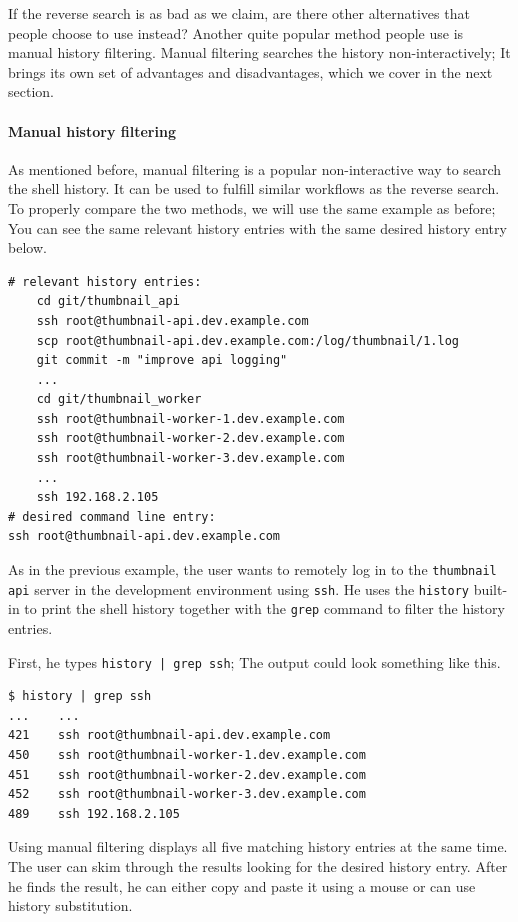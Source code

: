 If the reverse search is as bad as we claim, are there other alternatives that people choose to use instead? Another quite popular method people use is manual history filtering. Manual filtering searches the history non-interactively; It brings its own set of advantages and disadvantages, which we cover in the next section.


\paragraph{Manual history filtering}

As mentioned before, manual filtering is a popular non-interactive way to search the shell history. It can be used to fulfill similar workflows as the reverse search. To properly compare the two methods, we will use the same example as before; You can see the same relevant history entries with the same desired history entry below.


\begin{verbatim}
# relevant history entries:
    cd git/thumbnail_api
    ssh root@thumbnail-api.dev.example.com
    scp root@thumbnail-api.dev.example.com:/log/thumbnail/1.log
    git commit -m "improve api logging"
    ...
    cd git/thumbnail_worker
    ssh root@thumbnail-worker-1.dev.example.com
    ssh root@thumbnail-worker-2.dev.example.com
    ssh root@thumbnail-worker-3.dev.example.com
    ...
    ssh 192.168.2.105
# desired command line entry:
ssh root@thumbnail-api.dev.example.com
\end{verbatim}

As in the previous example, the user wants to remotely log in to the \verb|thumbnail| \verb|api| server in the development environment using \verb|ssh|. He uses the \verb|history| built-in to print the shell history together with the \verb|grep| command to filter the history entries.

First, he types \verb#history | grep ssh#; The output could look something like this.

\begin{verbatim}
$ history | grep ssh
...    ...
421    ssh root@thumbnail-api.dev.example.com
450    ssh root@thumbnail-worker-1.dev.example.com
451    ssh root@thumbnail-worker-2.dev.example.com
452    ssh root@thumbnail-worker-3.dev.example.com
489    ssh 192.168.2.105
\end{verbatim}


Using manual filtering displays all five matching history entries at the same time. The user can skim through the results looking for the desired history entry. 
After he finds the result, he can either copy and paste it using a mouse or can use history substitution.

